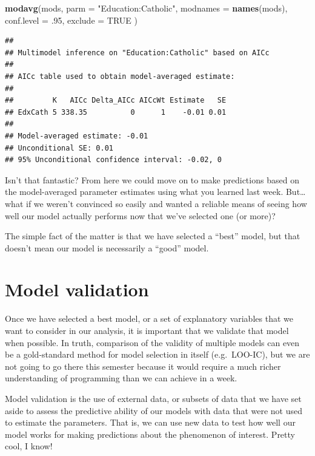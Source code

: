 \documentclass[
]{book}
\newenvironment{Shaded}{\begin{snugshade}}{\end{snugshade}}
\newcommand{\DataTypeTok}[1]{\textcolor[rgb]{0.13,0.29,0.53}{#1}}
\newcommand{\FloatTok}[1]{\textcolor[rgb]{0.00,0.00,0.81}{#1}}
\newcommand{\KeywordTok}[1]{\textcolor[rgb]{0.13,0.29,0.53}{\textbf{#1}}}
\newcommand{\NormalTok}[1]{#1}
\newcommand{\OtherTok}[1]{\textcolor[rgb]{0.56,0.35,0.01}{#1}}
\newcommand{\StringTok}[1]{\textcolor[rgb]{0.31,0.60,0.02}{#1}}
\begin{document}
\begin{Shaded}
\begin{Highlighting}[]
\KeywordTok{modavg}\NormalTok{(mods,}
  \DataTypeTok{parm =} \StringTok{"Education:Catholic"}\NormalTok{, }\DataTypeTok{modnames =} \KeywordTok{names}\NormalTok{(mods),}
  \DataTypeTok{conf.level =} \FloatTok{.95}\NormalTok{, }\DataTypeTok{exclude =} \OtherTok{TRUE}
\NormalTok{)}
\end{Highlighting}
\end{Shaded}

\begin{verbatim}
## 
## Multimodel inference on "Education:Catholic" based on AICc
## 
## AICc table used to obtain model-averaged estimate:
## 
##         K   AICc Delta_AICc AICcWt Estimate   SE
## EdxCath 5 338.35          0      1    -0.01 0.01
## 
## Model-averaged estimate: -0.01 
## Unconditional SE: 0.01 
## 95% Unconditional confidence interval: -0.02, 0
\end{verbatim}

Isn't that fantastic? From here we could move on to make predictions based on the model-averaged parameter estimates using what you learned last week. But\ldots what if we weren't convinced so easily and wanted a reliable means of seeing how well our model actually performs now that we've selected one (or more)?

The simple fact of the matter is that we have selected a ``best'' model, but that doesn't mean our model is necessarily a ``good'' model.

\hypertarget{model-validation}{%
\section{Model validation}\label{model-validation}}

Once we have selected a best model, or a set of explanatory variables that we want to consider in our analysis, it is important that we validate that model when possible. In truth, comparison of the validity of multiple models can even be a gold-standard method for model selection in itself (e.g.~LOO-IC), but we are not going to go there this semester because it would require a much richer understanding of programming than we can achieve in a week.

Model validation is the use of external data, or subsets of data that we have set aside to assess the predictive ability of our models with data that were not used to estimate the parameters. That is, we can use new data to test how well our model works for making predictions about the phenomenon of interest. Pretty cool, I know!
\end{document}
